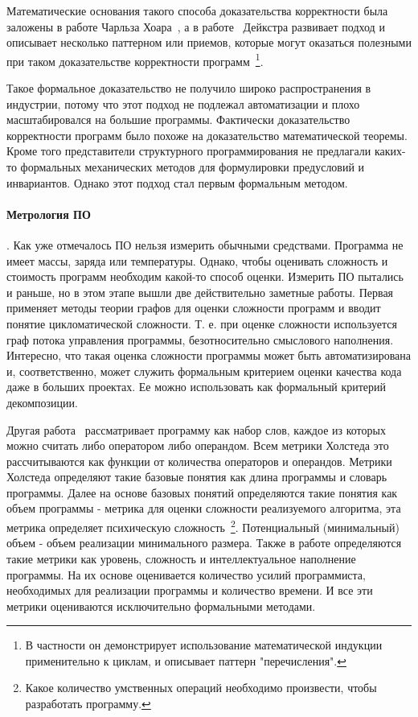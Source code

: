 Математические основания такого способа доказательства корректности была заложены в работе Чарльза Хоара~\cite{Hoare:1969:ABC}, а в работе~\cite{Dijkstra:1972:CIN} Дейкстра развивает подход и описывает несколько паттерном или приемов, которые могут оказаться полезными при таком доказательстве корректности программ~\footnote{В частности он демонстрирует использование математической индукции применительно к циклам, и описывает паттерн "перечисления".}.

Такое формальное доказательство не получило широко распространения в индустрии, потому что этот подход не подлежал автоматизации и плохо масштабировался на большие программы. Фактически доказательство корректности программ было похоже на доказательство математической теоремы. Кроме того представители структурного программирования не предлагали каких-то формальных механических методов для формулировки предусловий и инвариантов. Однако этот подход стал первым формальным методом.

\paragraph{Метрология ПО}. Как уже отмечалось ПО нельзя измерить обычными средствами. Программа не имеет массы, заряда или температуры. Однако, чтобы оценивать сложность и стоимость программ необходим какой-то способ оценки. Измерить ПО пытались и раньше, но в этом этапе вышли две действительно заметные работы. Первая~\cite{McCabe:1976:CM} применяет методы теории графов для оценки сложности программ и вводит понятие цикломатической сложности. Т. е. при оценке сложности используется граф потока управления программы, безотносительно смыслового наполнения. Интересно, что такая оценка сложности программы может быть автоматизирована и, соответственно, может служить формальным критерием оценки качества кода даже в больших проектах. Ее можно использовать как формальный критерий декомпозиции.

Другая работа~\cite{Halstead:1977:ESS} рассматривает программу как набор слов, каждое из которых можно считать либо оператором либо операндом. Всем метрики Холстеда это рассчитываются как функции от количества операторов и операндов. Метрики Холстеда определяют такие базовые понятия как длина программы и словарь программы. Далее на основе базовых понятий определяются такие понятия как объем программы - метрика для оценки сложности реализуемого алгоритма, эта метрика определяет психическую сложность~\footnote{Какое количество умственных операций необходимо произвести, чтобы разработать программу.}. Потенциальный (минимальный) объем - объем реализации минимального размера. Также в работе определяются такие метрики как уровень, сложность и интеллектуальное наполнение программы. На их основе оценивается количество усилий программиста, необходимых для реализации программы и количество времени. И все эти метрики оцениваются исключительно формальными методами.

